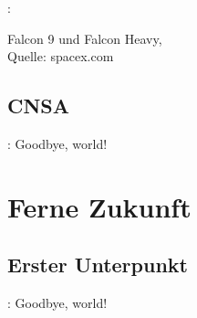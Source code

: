 \documentclass{beamer}
\begin{document}
\begin{frame}{\insertsection: \insertsubsection}
\begin{minipage}{.5\textwidth}
{		{\tiny Falcon 9 und Falcon Heavy,
			\\ Quelle: spacex.com}}
	
		
	\end{minipage}
\end{frame}

\subsection{CNSA}
\begin{frame}{\insertsection: \insertsubsection}
	Goodbye, world!
\end{frame}

\section{Ferne Zukunft}
\subsection{Erster Unterpunkt}
\begin{frame}{\insertsection: \insertsubsection}
	Goodbye, world!
\end{frame}
\end{document}
